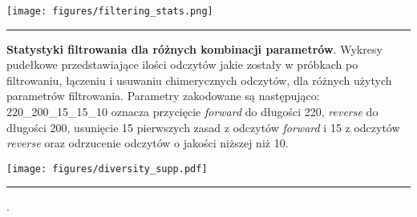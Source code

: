 \documentclass[two column, twoside, a4paper]{article}
\begin{document}
\begin{suppfigure*}[h]
  \begin{center}
    \texttt{[image: figures/filtering\_stats.png]}
  \end{center}

  \hrule width0.5\textwidth \vspace{0.5em}

  \caption{\textbf{Statystyki filtrowania dla różnych kombinacji parametrów}. Wykresy pudełkowe przedstawiające ilości odczytów jakie zostały w próbkach po filtrowaniu, łączeniu i usuwaniu chimerycznych odczytów, dla różnych użytych parametrów filtrowania. Parametry zakodowane są następująco: 220\_200\_15\_15\_10 oznacza przycięcie \textit{forward} do długości 220, \textit{reverse} do długości 200, usunięcie 15 pierwszych zasad z odczytów \textit{forward} i 15 z odczytów \textit{reverse} oraz odrzucenie odczytów o jakości niższej niż 10.}
  \label{fig:filtering_stats}
\end{suppfigure*}

\begin{suppfigure*}[h]
  \begin{center}
    \texttt{[image: figures/diversity\_supp.pdf]}
  \end{center}

  \hrule width0.5\textwidth \vspace{0.5em}

  \caption{\textbf{}. }
  \label{fig:diversity_supp}
\end{suppfigure*}
\end{document}
